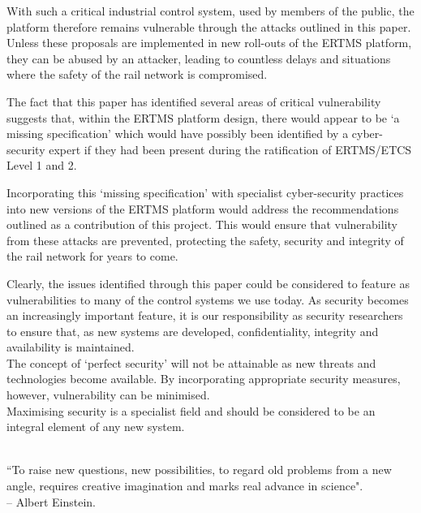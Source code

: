 \documentclass[twoside,11pt,a4paper]{article}
\begin{document}
With such a critical industrial control system, used by members of the public, the platform therefore remains vulnerable through the attacks outlined in this paper. Unless these proposals are implemented in new roll-outs of the ERTMS platform, they can be abused by an attacker, leading to countless delays and situations where the safety of the rail network is compromised.

The fact that this paper has identified several areas of critical vulnerability suggests that, within the ERTMS platform design, there would appear to be `a missing specification' which would have possibly been identified by a cyber-security expert if they had been present during the ratification of ERTMS/ETCS Level 1 and 2.

Incorporating this `missing specification' with specialist cyber-security practices into new versions of the ERTMS platform would address the recommendations outlined as a contribution of this project. This would ensure that vulnerability from these attacks are prevented, protecting the safety, security and integrity of the rail network for years to come.

Clearly, the issues identified through this paper could be considered to feature as vulnerabilities to many of the control systems we use today. As security becomes an increasingly important feature, it is our responsibility as security researchers to ensure that, as new systems are developed, confidentiality, integrity and availability is maintained.\\The concept of `perfect security' will not be attainable as new threats and technologies become available. By incorporating appropriate security measures, however, vulnerability can be minimised.\\Maximising security is a specialist field and should be considered to be an integral element of any new system.\\\\

\begin{center}
``To raise new questions, new possibilities, to regard old problems from a new angle, requires creative imagination and marks real advance in science".\\
-- Albert Einstein.
\end{center}

\clearpage
\lhead{}\rhead{}
{}


\end{document}

